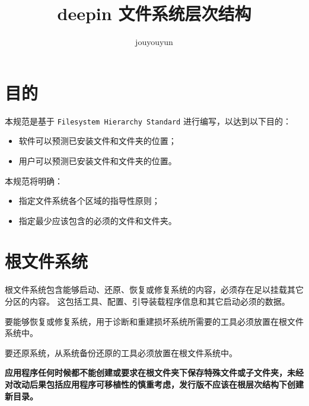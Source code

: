 \documentclass{utart}
\title{deepin 文件系统层次结构}
\author{jouyouyun}
\begin{document}
\utMakeTOC

\section{目的}
本规范是基于 \texttt{Filesystem Hierarchy Standard}\cite{FHS} 进行编写，以达到以下目的：
\begin{itemize}[leftmargin=4em]
\item 软件可以预测已安装文件和文件夹的位置；
\item 用户可以预测已安装文件和文件夹的位置。
\end{itemize}

本规范将明确：
\begin{itemize}[leftmargin=4em]
\item 指定文件系统各个区域的指导性原则；
\item 指定最少应该包含的必须的文件和文件夹。
\end{itemize}

\section{根文件系统}
根文件系统包含能够启动、还原、恢复或修复系统的内容，必须存在足以挂载其它分区的内容。
这包括工具、配置、引导装载程序信息和其它启动必须的数据。

要能够恢复或修复系统，用于诊断和重建损坏系统所需要的工具必须放置在根文件系统中。

要还原系统，从系统备份还原的工具必须放置在根文件系统中。

\textbf{应用程序任何时候都不能创建或要求在根文件夹下保存特殊文件或子文件夹，未经对改动后果包括应用程序可移植性的慎重考虑，发行版不应该在根层次结构下创建新目录。}
\end{document}
